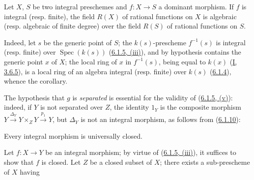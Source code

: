 \begin{corollary}[6.1.8]
\label{II.6.1.8}
Let $X$, $S$ be two integral preschemes and $f:X\to S$ a dominant morphism.
If $f$ is integral (resp. finite), the field $R(X)$ of rational functions on
$X$ is algebraic (resp. algebraic of finite degree) over the field $R(S)$ of
rational functions on $S$.
\end{corollary}

Indeed, let $s$ be the generic point of $S$; the $k(s)$-prescheme
$f^{-1}(s)$ is integral (resp. finite) over
$\operatorname{Spec}(k(s))$ (\hyperref[II.6.1.5]{6.1.5, (iii)}), and by
hypothesis contains the generic point $x$ of $X$; the local ring of $x$ in
$f^{-1}(s)$, being equal to $k(x)$ (\hyperref[I.3.6.5]{I, 3.6.5}), is a
local ring of an algebra integral (resp. finite) over $k(s)$
(\hyperref[II.6.1.4]{6.1.4}), whence the corollary.

\begin{remark}[6.1.9]
\label{II.6.1.9}
The hypothesis that $g$ is \emph{separated} is essential for the validity of
(\hyperref[II.6.1.5]{6.1.5, (v)}): indeed, if $Y$ is not separated over
$Z$, the identity $1_Y$ is the composite morphism
$Y\xrightarrow{\Delta_Y}Y\times_ZY\xrightarrow{p_1}Y$, but $\Delta_Y$ is not
an integral morphism, as follows from
(\hyperref[II.6.1.10]{6.1.10}):
\end{remark}

\begin{proposition}[6.1.10]
\label{II.6.1.10}
Every integral morphism is universally closed.
\end{proposition}

Let $f:X\to Y$ be an integral morphism; by virtue of
(\hyperref[II.6.1.5]{6.1.5, (iii)}), it suffices to show that $f$ is
closed. Let $Z$ be a closed subset of $X$; there exists a sub-prescheme of
$X$ having


